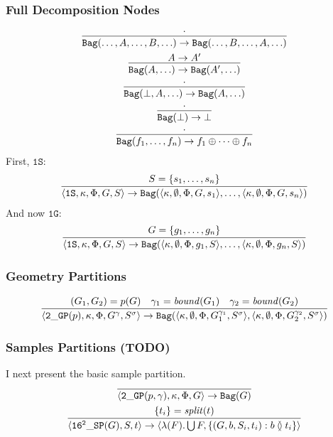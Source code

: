 \documentclass{article}
\newcommand {\oneS}{\mathtt{1S}}
\newcommand {\oneG}{\mathtt{1G}}
\newcommand {\sampP}{\mathtt{16^2\_SP}}
\newcommand {\twoGP}{\mathtt{2\_GP}}
\newcommand {\bound}{\mathit{bound}}
\newcommand {\bag}{\mathtt{Bag}}
\newcommand{\isect}{\between}
\begin{document}
\subsubsection{Full Decomposition Nodes}
\begin{gather}
\infer{\bag(\ldots, A,\ldots, B, \ldots) \to \bag(\ldots, B,\ldots, A, \ldots)}{\cdot}
\\
\infer{\bag(A, \ldots) \to \bag(A', \ldots)}{A \to A'}
\\
\infer{\bag(\bot, A, \ldots) \to \bag(A, \ldots)}{\cdot}
\\
\infer{\bag(\bot) \to \bot}{\cdot}
\\
\infer{\bag(f_1, \ldots, f_n) \to f_1 \oplus \cdots \oplus f_n}{\cdot} 
\end{gather}
First, $\oneS$:
\begin{gather}
\infer{\langle\oneS, \kappa, \Phi, G, S  \rangle \to \bag(
\langle \kappa, \emptyset, \Phi, G, s_1 \rangle, \ldots, 
\langle \kappa, \emptyset, \Phi, G, s_n \rangle)}
{S = \{s_1, \ldots, s_n\}}
\end{gather}
And now $\oneG$:
\begin{gather}
\infer{\langle\oneS, \kappa, \Phi, G, S \rangle \to \bag(
\langle \kappa, \emptyset, \Phi, g_1, S \rangle, \ldots, 
\langle \kappa, \emptyset, \Phi, g_n, S \rangle)}
{G = \{g_1, \ldots, g_n\}}
\end{gather}

\subsubsection{Geometry Partitions}
\begin{gather}
\infer{
\langle\twoGP(p), \kappa, \Phi, G^\gamma, S^\sigma \rangle \to \bag(
\langle \kappa, \emptyset, \Phi, G_1^{\gamma_1}, S^\sigma \rangle,
\langle \kappa, \emptyset, \Phi, G_2^{\gamma_2}, S^\sigma \rangle)}
{(G_1,G_2) = p(G) & \gamma_1 = \bound(G_1) & \gamma_2 = \bound(G_2)}
\end{gather}

\subsubsection{Samples Partitions (TODO)}
I next present the basic sample partition.
\begin{gather}
\infer{\langle\twoGP(p, \gamma), \kappa, \Phi, G \rangle \to \bag(G)}{}
\\
\infer{\langle\sampP(G), S, t\rangle \to \langle \lambda(F).\bigcup F, \{(G, b, S_i, t_i) : b \isect t_i \}\rangle}{\{t_i\} = \mathit{split}(t)} 
\end{gather}
\end{document}
